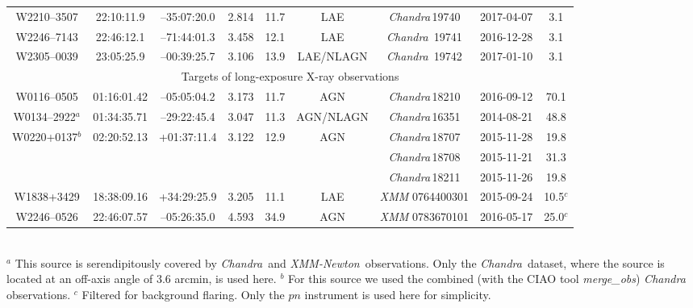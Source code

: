 \documentclass[useAMS,usenatbib]{mnras}
\newcommand*{\xmm}{\textit{\mbox{XMM-Newton}}}
\newcommand*{\chandra}{\textit{Chandra}}
\begin{document}
\begin{table*}
\begin{tabular}{ccccccccc}
		W2210--3507 & 22:10:11.9 & --35:07:20.0 &  2.814 & 11.7 & LAE &  \chandra\,19740 &  2017-04-07&  3.1\\
		W2246--7143 & 22:46:12.1 & --71:44:01.3 & 3.458  & 12.1 & LAE & \chandra\, 19741 & 2016-12-28 &3.1\\
		W2305--0039 & 23:05:25.9 & --00:39:25.7 & 3.106  & 13.9 & LAE/NLAGN & \chandra\, 19742 & 2017-01-10 & 3.1\\
		\hline
		\multicolumn{9}{c}{Targets of long-exposure X-ray observations}\\		
			W0116--0505 &01:16:01.42 & --05:05:04.2 & 3.173 &11.7 & AGN & \chandra\,18210 & 2016-09-12 & 70.1 \\
		W0134--2922$^a$ &01:34:35.71 & --29:22:45.4 & 3.047 &11.3 & AGN/NLAGN &\chandra\,16351 & 2014-08-21& 48.8  \\	
		W0220+0137$^b$ & 02:20:52.13 & +01:37:11.4  & 3.122	 & 12.9 & AGN & \chandra\,18707  & 2015-11-28& 19.8\\
		&                     &                    &            &      &     &\chandra\,18708 & 2015-11-21 &   31.3\\
		&                     &                    &            &      &     &\chandra\,18211  & 2015-11-26&   19.8\\
		W1838+3429& 18:38:09.16 & +34:29:25.9 & 3.205 & 11.1 &  LAE &\textit{XMM} 0764400301	 & 2015-09-24&10.5$^c$\\	
		W2246--0526& 22:46:07.57 & --05:26:35.0&4.593 & 34.9& AGN &\textit{XMM} 0783670101   & 2016-05-17& 25.0$^c$\\

		\hline
	\end{tabular}\\
$^a$ This source is serendipitously covered by \chandra\, and \xmm\, observations. Only the \chandra\, dataset, where the source is located at an off-axis angle of 3.6 arcmin, is used here. $^b$ For this source we used the combined (with the CIAO tool \textit{merge\_obs}) \chandra\, observations. $^c$ Filtered for background flaring. Only the $pn$ instrument is used here for simplicity.
\end{table*}
\end{document}
